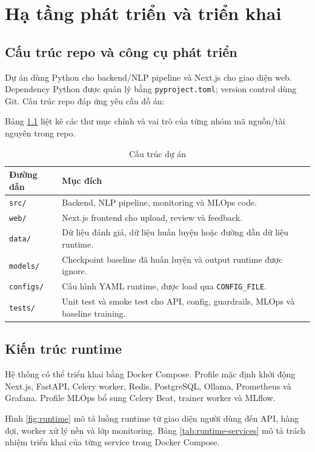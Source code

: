 \chapter{Hạ tầng phát triển và triển khai}

\section{Cấu trúc repo và công cụ phát triển}

Dự án dùng Python cho backend/NLP pipeline và Next.js cho giao diện web. Dependency Python được quản lý bằng \texttt{pyproject.toml}; version control dùng Git. Cấu trúc repo đáp ứng yêu cầu đồ án:

Bảng \ref{tab:project-structure} liệt kê các thư mục chính và vai trò của từng nhóm mã nguồn/tài nguyên trong repo.

\begin{table}[H]
\centering
\small
\caption{Cấu trúc dự án}
\label{tab:project-structure}
\begin{tabularx}{\textwidth}{@{}p{3.0cm}X@{}}
\toprule
\textbf{Đường dẫn} & \textbf{Mục đích} \\
\midrule
\texttt{src/} & Backend, NLP pipeline, monitoring và MLOps code. \\
\texttt{web/} & Next.js frontend cho upload, review và feedback. \\
\texttt{data/} & Dữ liệu đánh giá, dữ liệu huấn luyện hoặc đường dẫn dữ liệu runtime. \\
\texttt{models/} & Checkpoint baseline đã huấn luyện và output runtime được ignore. \\
\texttt{configs/} & Cấu hình YAML runtime, được load qua \texttt{CONFIG\_FILE}. \\
\texttt{tests/} & Unit test và smoke test cho API, config, guardrails, MLOps và baseline training. \\
\bottomrule
\end{tabularx}
\end{table}

\section{Kiến trúc runtime}

Hệ thống có thể triển khai bằng Docker Compose. Profile mặc định khởi động Next.js, FastAPI, Celery worker, Redis, PostgreSQL, Ollama, Prometheus và Grafana. Profile MLOps bổ sung Celery Beat, trainer worker và MLflow.

Hình \ref{fig:runtime} mô tả luồng runtime từ giao diện người dùng đến API, hàng đợi, worker xử lý nền và lớp monitoring. Bảng \ref{tab:runtime-services} mô tả trách nhiệm triển khai của từng service trong Docker Compose.

